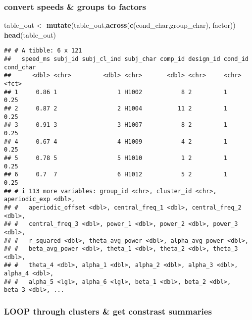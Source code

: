 \documentclass[
]{article}
\newenvironment{Shaded}{\begin{snugshade}}{\end{snugshade}}
\newcommand{\FunctionTok}[1]{\textcolor[rgb]{0.13,0.29,0.53}{\textbf{#1}}}
\newcommand{\NormalTok}[1]{#1}
\newcommand{\OtherTok}[1]{\textcolor[rgb]{0.56,0.35,0.01}{#1}}
\newcommand{\StringTok}[1]{\textcolor[rgb]{0.31,0.60,0.02}{#1}}
\begin{document}
\hypertarget{convert-speeds-groups-to-factors}{%
\subsubsection{convert speeds \& groups to
factors}\label{convert-speeds-groups-to-factors}}

\begin{Shaded}
\begin{Highlighting}[]
\NormalTok{table\_out }\OtherTok{\textless{}{-}} \FunctionTok{mutate}\NormalTok{(table\_out,}\FunctionTok{across}\NormalTok{(}\FunctionTok{c}\NormalTok{(}\StringTok{\textquotesingle{}cond\_char\textquotesingle{}}\NormalTok{,}\StringTok{\textquotesingle{}group\_char\textquotesingle{}}\NormalTok{), factor))}
\FunctionTok{head}\NormalTok{(table\_out)}
\end{Highlighting}
\end{Shaded}

\begin{verbatim}
## # A tibble: 6 x 121
##   speed_ms subj_id subj_cl_ind subj_char comp_id design_id cond_id cond_char
##      <dbl> <chr>         <dbl> <chr>       <dbl> <chr>     <chr>   <fct>    
## 1     0.86 1                 1 H1002           8 2         1       0.25     
## 2     0.87 2                 2 H1004          11 2         1       0.25     
## 3     0.91 3                 3 H1007           8 2         1       0.25     
## 4     0.67 4                 4 H1009           4 2         1       0.25     
## 5     0.78 5                 5 H1010           1 2         1       0.25     
## 6     0.7  7                 6 H1012           5 2         1       0.25     
## # i 113 more variables: group_id <chr>, cluster_id <chr>, aperiodic_exp <dbl>,
## #   aperiodic_offset <dbl>, central_freq_1 <dbl>, central_freq_2 <dbl>,
## #   central_freq_3 <dbl>, power_1 <dbl>, power_2 <dbl>, power_3 <dbl>,
## #   r_squared <dbl>, theta_avg_power <dbl>, alpha_avg_power <dbl>,
## #   beta_avg_power <dbl>, theta_1 <dbl>, theta_2 <dbl>, theta_3 <dbl>,
## #   theta_4 <dbl>, alpha_1 <dbl>, alpha_2 <dbl>, alpha_3 <dbl>, alpha_4 <dbl>,
## #   alpha_5 <lgl>, alpha_6 <lgl>, beta_1 <dbl>, beta_2 <dbl>, beta_3 <dbl>, ...
\end{verbatim}

\hypertarget{loop-through-clusters-get-constrast-summaries}{%
\subsubsection{LOOP through clusters \& get constrast
summaries}\label{loop-through-clusters-get-constrast-summaries}}
\end{document}
